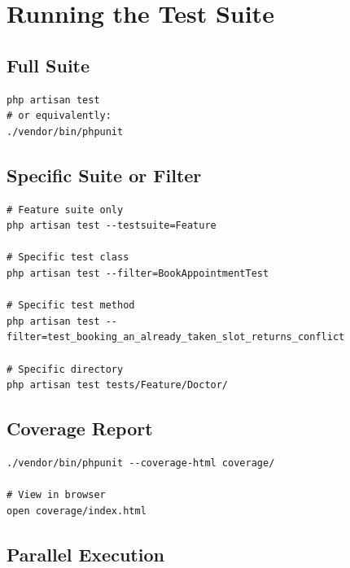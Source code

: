 \section{Running the Test Suite}
\label{sec:running-tests}

\subsection{Full Suite}

\begin{lstlisting}[style=bash, caption={Run all tests.}]
php artisan test
# or equivalently:
./vendor/bin/phpunit
\end{lstlisting}

\subsection{Specific Suite or Filter}

\begin{lstlisting}[style=bash, caption={Run only the Feature suite, or filter
  to a specific test class or method.}]
# Feature suite only
php artisan test --testsuite=Feature

# Specific test class
php artisan test --filter=BookAppointmentTest

# Specific test method
php artisan test --filter=test_booking_an_already_taken_slot_returns_conflict

# Specific directory
php artisan test tests/Feature/Doctor/
\end{lstlisting}

\subsection{Coverage Report}

\begin{lstlisting}[style=bash, caption={Generate an HTML coverage report
  (requires Xdebug or PCOV).}]
./vendor/bin/phpunit --coverage-html coverage/

# View in browser
open coverage/index.html
\end{lstlisting}

\subsection{Parallel Execution}

